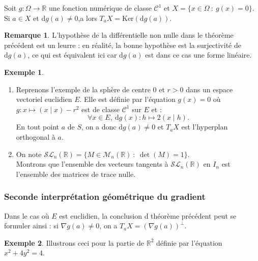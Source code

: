 \documentclass[french]{article}
\newcommand{\R}{\mathbb{R}}
\renewcommand{\ker}{\text{Ker}}
\newcommand{\Tr}{\text{Tr}}
\renewcommand{\d}{\text{d}}
\theoremstyle{plain}
\theoremstyle{definition}
\newtheorem*{ex}{Exemple}
\newtheorem*{rmq}{Remarque}
\theoremstyle{remark}
\begin{document}
\begin{thm}%
	Soit $g:\Omega\to\R$ une fonction numérique de classe $\mathcal{C}^1$ et $X=\{x\in\Omega\ :\ g(x)=0\}$. \\
	Si $a\in X$ et $\d g(a)\ne0$,a lors $T_aX=\ker(\d g(a))$.
\end{thm}

\begin{rmq}
	L'hypothèse de la différentielle non nulle dans le théorème précédent est un leurre : en réalité, la bonne hypothèse est la surjectivité de $\d g(a)$, ce qui est équivalent ici car $\d g(a)$ est dans ce cas une forme linéaire.
\end{rmq}

\begin{ex}
	\begin{enumerate}
		\item Reprenons l'exemple de la sphère de centre $0$ et $r>0$ dans un espace vectoriel euclidien $E$. Elle est définie par l'équation $g(x)=0$ où $g:x\mapsto (x\mid x)-r^2$ est de classe $\mathcal{C}^1$ sur $E$ et :
		$$\forall x\in E,\ \d g(x):h\mapsto 2(x\mid h).$$
		En tout point $a$ de $S$, on a donc $\d g(a)\ne0$ et $T_aX$ est l'hyperplan orthogonal à $a$.
		\item On note $\mathcal{SL}_n(\R)=\{M\in\mathcal{M}_n(\R)\ :\ \det(M)=1\}$.\\
		Montrons que l'ensemble des vecteurs tangents à $\mathcal{SL}_n(\R)$ en $I_n$ est l'ensemble des matrices de trace nulle. %
	\end{enumerate}
\end{ex}

\subsubsection*{Seconde interprétation géométrique du gradient}

Dans le cas où $E$ est euclidien, la conclusion d théorème précédent peut se formuler ainsi : si $\nabla g(a)\ne0$, on a $T_aX=(\nabla g(a))^\bot$.

\begin{ex}
	Illustrons ceci pour la partie de $\R^2$ définie par l'équation $x^2+4y^2=4$.
\end{ex}
\end{document}
